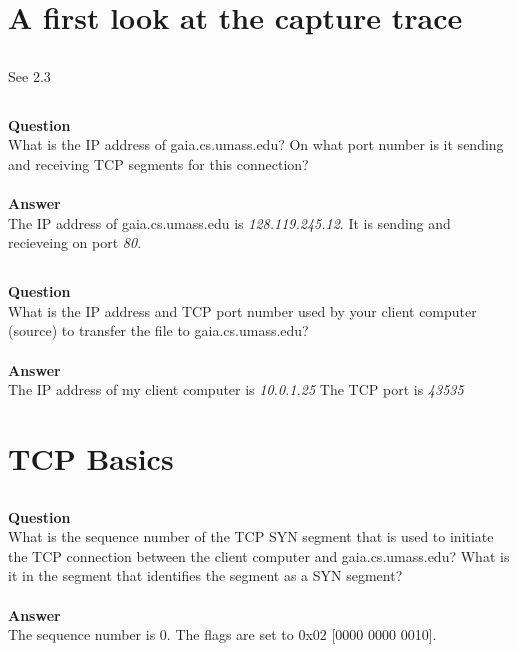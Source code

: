 \documentclass[12pt]{article}
\begin{document}
\maketitle

\setcounter{section}{1}
\section{A first look at the capture trace}

\subsection{}
See 2.3

\subsection{}
\textbf{Question}\\
What is the IP address of gaia.cs.umass.edu? On what port number is it sending 
and receiving TCP segments for this connection?\\\\
\noindent\textbf{Answer}\\
The IP address of gaia.cs.umass.edu is \emph{128.119.245.12}. It is sending 
and recieveing on port \emph{80}.

\tiny

\normalsize

\subsection{}
\label{section3}
\textbf{Question}\\
What is the IP address and TCP port number used by your client computer 
(source) to transfer the file to gaia.cs.umass.edu?\\\\
\noindent\textbf{Answer}\\
The IP address of my client computer is \emph{10.0.1.25} The TCP port is \emph{43535}

\section{TCP Basics}
\setcounter{subsection}{3}
\subsection{}
\textbf{Question}\\
What is the sequence number of the TCP SYN segment that is used to initiate the
TCP connection between the client computer and gaia.cs.umass.edu? What is it
in the segment that identifies the segment as a SYN segment?\\\\
\noindent\textbf{Answer}\\
The sequence number is 0. The flags are set to 0x02 [0000 0000 0010].
\end{document}
